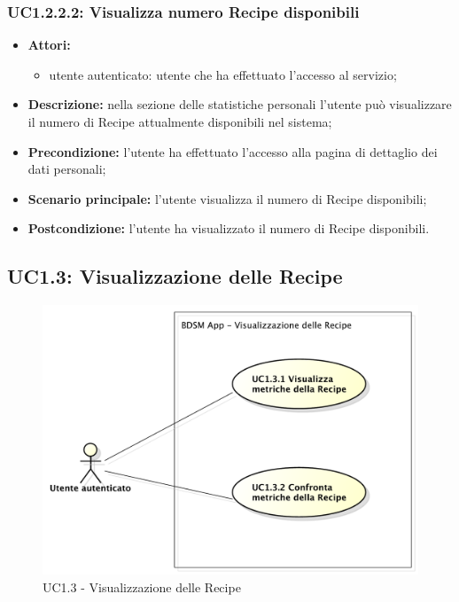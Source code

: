 \subsubsection{UC1.2.2.2: Visualizza numero Recipe disponibili}
\begin{itemize}
	\item \textbf{Attori:}
	\begin{itemize}
		\item utente autenticato: utente che ha effettuato l'accesso al servizio;
	\end{itemize}
	\item \textbf{Descrizione:} nella sezione delle statistiche personali l'utente può visualizzare il numero di Recipe attualmente disponibili nel sistema;
	\item \textbf{Precondizione:} l'utente ha effettuato l'accesso alla pagina di dettaglio dei dati personali;
	\item \textbf{Scenario principale:} l'utente visualizza il numero di Recipe disponibili;
	\item \textbf{Postcondizione:} l'utente ha visualizzato il numero di Recipe disponibili.
\end{itemize}

\pagebreak
\subsection{UC1.3: Visualizzazione delle Recipe}
\begin{figure}[!htbp]
	\centering
	\centerline{\includegraphics[scale=0.45]{./images/UC1_3.pdf}}
	\caption{UC1.3 - Visualizzazione delle Recipe}
\end{figure}

